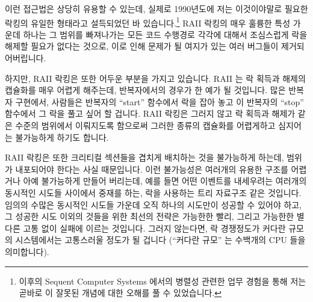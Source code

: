 이런 접근법은 상당히 유용할 수 있는데, 실제로 1990년도에 저는 이것이야말로
필요한 락킹의 유일한 형태라고 설득되었던 바 있습니다.\footnote{
	이후의 Sequent Computer Systems 에서의 병렬성 관련한 업무 경험을 통해
	저는 곧바로 이 잘못된 개념에 대한 오해를 풀 수 있었습니다.}
RAII 락킹의 매우 훌륭한 특성 가운데 하나는 그 범위를 빠져나가는 모든 코드
수행경로 각각에 대해서 조심스럽게 락을 해제할 필요가 없다는 것으로, 이로 인해
문제가 될 여지가 있는 여러 버그들이 제거되어버립니다.

하지만, RAII 락킹은 또한 어두운 부분을 가지고 있습니다.
RAII 는 락 획득과 해제의 캡슐화를 매우 어렵게 해주는데, 반복자에서의 경우가 한
예가 될 것입니다.
많은 반복자 구현에서, 사람들은 반복자의 ``start'' 함수에서 락을 잡아 놓고 이
반복자의 ``stop'' 함수에서 그 락을 풀고 싶어 할 겁니다.
RAII 락킹은 그러지 않고 락 획득과 해제가 같은 수준의 범위에서 이뤄지도록
함으로써 그러한 종류의 캡슐화를 어렵게하고 심지어는 불가능하게 하기도 합니다.

RAII 락킹은 또한 크리티컬 섹션들을 겹치게 배치하는 것을 불가능하게 하는데,
범위가 내포되어야 한다는 사실 때문입니다.
이런 불가능성은 여러개의 유용한 구조를 어렵거나 아예 불가능하게 만들어
버리는데, 예를 들면 어떤 이벤트를 내세우려는 여러개의 동시적인 시도들 사이에서
중재를 하는, 락을 사용하는 트리 자료구조 같은 것입니다.
임의의 수많은 동시적인 시도들 가운데 오직 하나의 시도만이 성공할 수 있어야
하고, 그 성공한 시도 이외의 것들을 위한 최선의 전략은 가능한한 빨리, 그리고
가능한한 별다른 고통 없이 실패에 이르는 것입니다.
그러지 않는다면, 락 경쟁정도가 커다란 규모의 시스템에서는 고통스러울 정도가 될
겁니다 (``커다란 규모'' 는 수백개의 CPU 들을 의미합니다).
\iffalse

